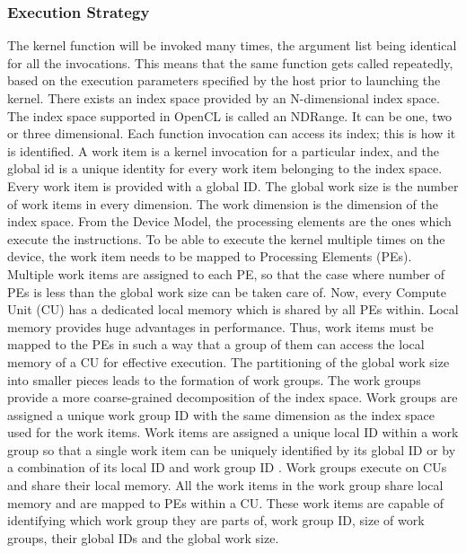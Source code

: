 \subsubsection{Execution Strategy}
\label{sect4_1_3_1}
The kernel function will be invoked many times, the argument list being identical for all the invocations. This means that the same function gets called repeatedly, based on the execution parameters specified by the host prior to launching the kernel.\newline\newline
There exists an index space provided by an N-dimensional index space. The index space supported in OpenCL is called an NDRange. It can be one, two or three dimensional. Each function invocation can access its index; this is how it is identified. A work item is a kernel invocation for a particular index, and the global id is a unique identity for every work item belonging to the index space. Every work item is provided with a global ID. The global work size is the number of work items in every dimension. The work dimension is the dimension of the index space.\newline\newline 
From the Device Model, the processing elements are the ones which execute the instructions. To be able to execute the kernel multiple times on the device, the work item needs to be mapped to Processing Elements (PEs). Multiple work items are assigned to each PE, so that the case where number of PEs is less than the global work size can be taken care of. \newline\newline
Now, every Compute Unit (CU) has a dedicated local memory which is shared by all PEs within. Local memory provides huge advantages in performance. Thus, work items must be mapped to the PEs in such a way that a group of them can access the local memory of a CU for effective execution. The partitioning of the global work size into smaller pieces leads to the formation of work groups. The work groups provide a more coarse-grained decomposition of the index space. Work groups are assigned a unique work group ID with the same dimension as the index space used for the work items. Work items are assigned a unique local ID within a work group so that a single work item can be uniquely identified by its global ID or by a combination of its local ID and work group ID \cite{opencl_khronos}. \newline\newline
Work groups execute on CUs and share their local memory. All the work items in the work group share local memory and are mapped to PEs within a CU. These work items are capable of identifying which work group they are parts of, work group ID, size of work groups, their global IDs and the global work size. \newline\newline 
